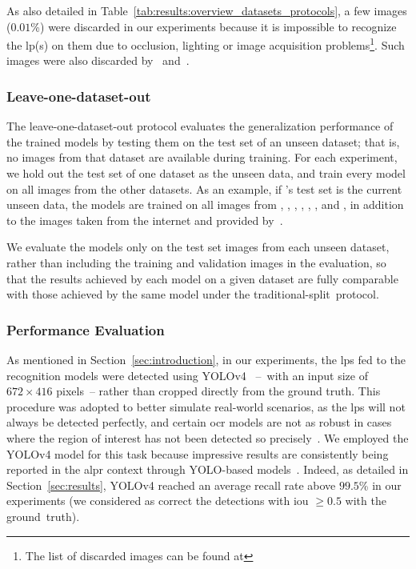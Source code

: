As also detailed in Table~\ref{tab:results:overview_datasets_protocols}, a few images ($0.01$\%) were discarded in our experiments because it is impossible to recognize the \gls*{lp}(s) on them due to occlusion, lighting or image acquisition problems\footnote{\scriptsize The list of discarded images can be found at \discarded}.
Such images were also discarded by~\cite{masood2017sighthound} and~\cite{laroca2021efficient}.

\subsubsection{Leave-one-dataset-out}
\label{sec:experiments-protocol:leave-one-dataset-out}

The leave-one-dataset-out protocol evaluates the generalization performance of the trained models by testing them on the test set of an unseen dataset; that is, no images from that dataset are available during training.
For each experiment, we hold out the test set of one dataset as the unseen data, and train every model on all images from the other datasets.
As an example, if \aolp's test set is the current unseen data, the models are trained on all images from \caltech, \englishlp, \stills, \chineselp, \openalpreu, \ssigsegplate, \ufpralpr and \dataset, in addition to the images taken from the internet and provided by~\cite{laroca2021efficient}.

We evaluate the models only on the test set images from each unseen dataset, rather than including the training and validation images in the evaluation, so that the results achieved by each model on a given dataset are fully comparable with those achieved by the same model under the traditional-split~protocol.

\subsubsection{Performance Evaluation}
\label{sec:experiments-protocol:performance-evaluation}

As mentioned in Section~\ref{sec:introduction}, in our experiments, the \glspl*{lp} fed to the recognition models were detected using YOLOv4~\citep{bochkovskiy2020yolov4} --~with an input size of $672\times416$ pixels~-- rather than cropped directly from the ground truth. 
This procedure was adopted to better simulate real-world scenarios, as the \glspl*{lp} will not always be detected perfectly, and certain \gls*{ocr} models are not as robust in cases where the region of interest has not been detected so precisely~\citep{goncalves2018realtime}.
We employed the YOLOv4 model for this task because impressive results are consistently being reported in the \gls*{alpr} context through YOLO-based models~\citep{weihong2020research}.
Indeed, as detailed in Section~\ref{sec:results}, YOLOv4 reached an average recall rate above $99.5$\% in our experiments (we considered as correct the detections with \gls*{iou} $\ge0.5$ with the ground~truth).

